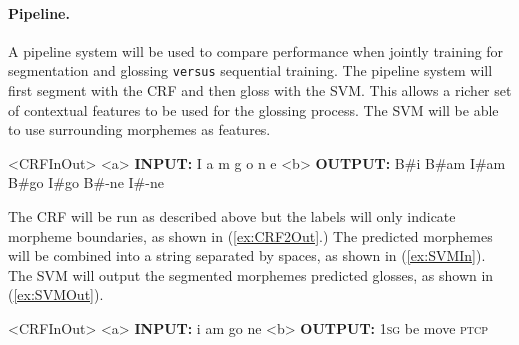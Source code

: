 \paragraph{Pipeline.}
A pipeline system will be used to compare performance when jointly training for segmentation and glossing {\tt versus} sequential training. 
The pipeline system will first segment with the CRF and then gloss with the SVM. This allows a richer set of contextual features to be used for the glossing process. The SVM will be able to  use surrounding morphemes as features.   

\begin{singlespace}
\pex<CRFInOut>   
\label{ex:CRF2InOut}
\a<a> \textbf{INPUT:} \hspace{8 mm} I \hspace{8 mm} a \hspace{9 mm} m \hspace{8 mm} g \hspace{8 mm} o \hspace{8 mm} n \hspace{10 mm} e 
\label{ex:CRF2in}
\a<b> \textbf{OUTPUT:} \hspace{2 mm} B\#i \hspace{1 mm} B\#am \hspace{1 mm} I\#am \hspace{1 mm} B\#go \hspace{1 mm} I\#go \hspace{1 mm} B\#-ne \hspace{1 mm} I\#-ne
\label{ex:CRF2Out}
\xe
\end{singlespace}

The CRF will be run as described above but the labels will only indicate morpheme boundaries, as shown in (\ref{ex:CRF2Out}.) The predicted morphemes will be combined into a string separated by spaces, as shown in (\ref{ex:SVMIn}). The SVM will output the segmented morphemes predicted glosses, as shown in (\ref{ex:SVMOut}). 

\begin{singlespace}
\pex<CRFInOut>   
\label{ex:SVMInOut}
\a<a> \textbf{INPUT:} \hspace{7 mm} i \hspace{4 mm} am \hspace{2 mm} go \hspace{5 mm} ne 
\label{ex:SVMIn}
\a<b> \textbf{OUTPUT:} \hspace{1 mm} 1\textsc{sg} \hspace{1 mm} be \hspace{1 mm} move \hspace{1 mm} \textsc{ptcp}
\label{ex:SVMOut}
\xe
\end{singlespace}


